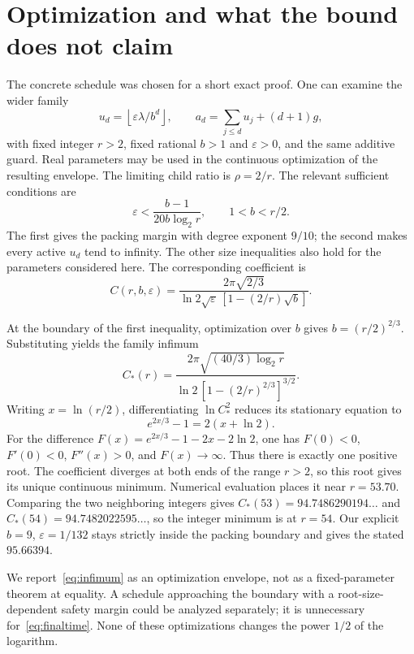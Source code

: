 \documentclass[11pt,letterpaper]{article}
\numberwithin{equation}{section}
\theoremstyle{definition}\newtheorem{definition}[theorem]{Definition}
\theoremstyle{remark}\newtheorem{remark}[theorem]{Remark}
\newcommand{\floor}[1]{\left\lfloor #1\right\rfloor}
\newcommand{\eps}{\varepsilon}
\begin{document}
\section{Optimization and what the bound does not claim}
\label{sec:optimization}

The concrete schedule was chosen for a short exact proof. One can examine the wider family
\[
 u_d=\floor{\eps\lambda/b^d},\qquad
 a_d=\sum_{j\le d}u_j+(d+1)g,
\]
with fixed integer $r>2$, fixed rational $b>1$ and $\eps>0$, and the same additive guard. Real parameters may be used in the continuous optimization of the resulting envelope. The limiting child ratio is $\rho=2/r$. The relevant sufficient conditions are
\begin{equation}\label{eq:generalconditions}
 \eps<\frac{b-1}{20b\log_2r},\qquad 1<b<r/2.
\end{equation}
The first gives the packing margin with degree exponent $9/10$; the second makes every active $u_d$ tend to infinity. The other size inequalities also hold for the parameters considered here. The corresponding coefficient is
\begin{equation}\label{eq:generalC}
 C(r,b,\eps)=\frac{2\pi\sqrt{2/3}}
 {\ln2\sqrt\eps\,[1-(2/r)\sqrt b]}.
\end{equation}

At the boundary of the first inequality, optimization over $b$ gives $b=(r/2)^{2/3}$. Substituting yields the family infimum
\begin{equation}\label{eq:infimum}
 C_*(r)=\frac{2\pi\sqrt{(40/3)\log_2r}}
 {\ln2\,[1-(2/r)^{2/3}]^{3/2}}.
\end{equation}
Writing $x=\ln(r/2)$, differentiating $\ln C_*^2$ reduces its stationary equation to
\[
 e^{2x/3}-1=2(x+\ln2).
\]
For the difference $F(x)=e^{2x/3}-1-2x-2\ln2$, one has $F(0)<0$, $F'(0)<0$, $F''(x)>0$, and $F(x)\to\infty$. Thus there is exactly one positive root. The coefficient diverges at both ends of the range $r>2$, so this root gives its unique continuous minimum. Numerical evaluation places it near $r=53.70$. Comparing the two neighboring integers gives $C_*(53)=94.7486290194\ldots$ and $C_*(54)=94.7482022595\ldots$, so the integer minimum is at $r=54$. Our explicit $b=9$, $\eps=1/132$ stays strictly inside the packing boundary and gives the stated $95.66394$.

We report~\eqref{eq:infimum} as an optimization envelope, not as a fixed-parameter theorem at equality. A schedule approaching the boundary with a root-size-dependent safety margin could be analyzed separately; it is unnecessary for~\eqref{eq:finaltime}. None of these optimizations changes the power $1/2$ of the logarithm.
\end{document}
